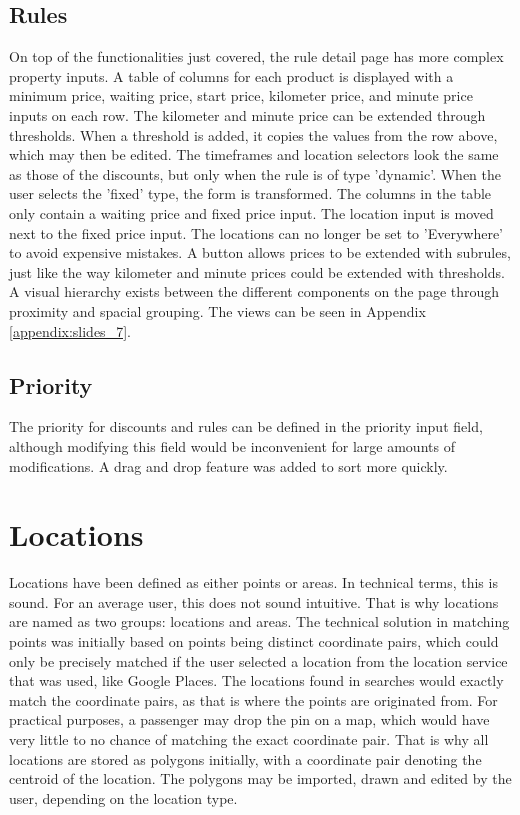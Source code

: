 \subsection{Rules}
On top of the functionalities just covered, the rule detail page has more complex property inputs. A table of columns for each product is displayed with a minimum price, waiting price, start price, kilometer price, and minute price inputs on each row. The kilometer and minute price can be extended through thresholds. When a threshold is added, it copies the values from the row above, which may then be edited. The timeframes and location selectors look the same as those of the discounts, but only when the rule is of type 'dynamic'. When the user selects the 'fixed' type, the form is transformed. The columns in the table only contain a waiting price and fixed price input. The location input is moved next to the fixed price input. The locations can no longer be set to 'Everywhere' to avoid expensive mistakes. A button allows prices to be extended with subrules, just like the way kilometer and minute prices could be extended with thresholds. A visual hierarchy exists between the different components on the page through proximity and spacial grouping. The views can be seen in Appendix \ref{appendix:slides_7}.

\subsection{Priority}
The priority for discounts and rules can be defined in the priority input field, although modifying this field would be inconvenient for large amounts of modifications. A drag and drop feature was added to sort more quickly.

\section{Locations}
Locations have been defined as either points or areas. In technical terms, this is sound. For an average user, this does not sound intuitive. That is why locations are named as two groups: locations and areas. The technical solution in matching points was initially based on points being distinct coordinate pairs, which could only be precisely matched if the user selected a location from the location service that was used, like Google Places. The locations found in searches would exactly match the coordinate pairs, as that is where the points are originated from. For practical purposes, a passenger may drop the pin on a map, which would have very little to no chance of matching the exact coordinate pair. That is why all locations are stored as polygons initially, with a coordinate pair denoting the centroid of the location. The polygons may be imported, drawn and edited by the user, depending on the location type.

